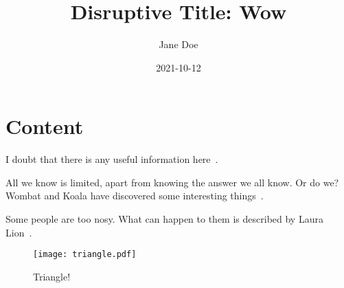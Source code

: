 \documentclass{article}
\title{Disruptive Title: Wow}
\date{2021-10-12}
\author{Jane Doe}
\begin{document}
\maketitle

\section{Content}
I doubt that there is any useful information here~\cite{wikibook}.

All we know is limited, apart from knowing the answer we all know. Or do we? Wombat and Koala have discovered some interesting things~\cite{wombat2016}.

Some people are too nosy. What can happen to them is described by Laura Lion~\cite[9]{lion2010}.

\begin{figure}[h]
    \centering
    \texttt{[image: triangle.pdf]}
    \caption{Triangle!}
\end{figure}

\printbibliography
\end{document}
